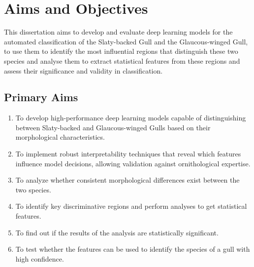 \documentclass[a4paper,12pt]{report}
\begin{document}



\chapter{Aims and Objectives}

This dissertation aims to develop and evaluate deep learning models for the automated classification of the Slaty-backed Gull and the Glaucous-winged Gull, to use them to identify the most influential regions that distinguish these two species and analyse them to extract statistical features from these regions and assess their significance and validity in classification.

\section{Primary Aims}
\begin{enumerate}
    \item To develop high-performance deep learning models capable of distinguishing between Slaty-backed and Glaucous-winged Gulls based on their morphological characteristics.
    \item To implement robust interpretability techniques that reveal which features influence model decisions, allowing validation against ornithological expertise.
    \item To analyze whether consistent morphological differences exist between the two species. 
    \item To identify key discriminative regions and perform analyses to get statistical features.
    \item To find out if the results of the analysis are statistically significant.
    \item To test whether the features can be used to identify the species of a gull with high confidence.
\end{enumerate}
\end{document}
